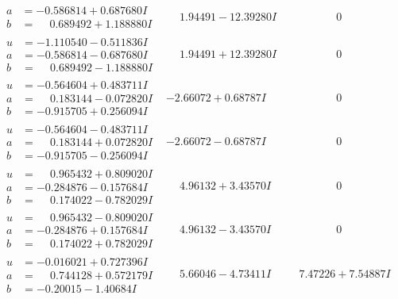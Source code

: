 \documentclass[1p]{elsarticle_modified}
\theoremstyle{definition}
\begin{document}
$$\begin{array}{c|c|c}
\begin{aligned}
a &= -0.586814 + 0.687680 I \\
b &= \phantom{-}0.689492 + 1.188880 I\end{aligned}
 & \phantom{-}1.94491 - 12.39280 I & \phantom{-0.000000 } 0 \\ \hline\begin{aligned}
u &= -1.110540 - 0.511836 I \\
a &= -0.586814 - 0.687680 I \\
b &= \phantom{-}0.689492 - 1.188880 I\end{aligned}
 & \phantom{-}1.94491 + 12.39280 I & \phantom{-0.000000 } 0 \\ \hline\begin{aligned}
u &= -0.564604 + 0.483711 I \\
a &= \phantom{-}0.183144 - 0.072820 I \\
b &= -0.915705 + 0.256094 I\end{aligned}
 & -2.66072 + 0.68787 I & \phantom{-0.000000 } 0 \\ \hline\begin{aligned}
u &= -0.564604 - 0.483711 I \\
a &= \phantom{-}0.183144 + 0.072820 I \\
b &= -0.915705 - 0.256094 I\end{aligned}
 & -2.66072 - 0.68787 I & \phantom{-0.000000 } 0 \\ \hline\begin{aligned}
u &= \phantom{-}0.965432 + 0.809020 I \\
a &= -0.284876 - 0.157684 I \\
b &= \phantom{-}0.174022 - 0.782029 I\end{aligned}
 & \phantom{-}4.96132 + 3.43570 I & \phantom{-0.000000 } 0 \\ \hline\begin{aligned}
u &= \phantom{-}0.965432 - 0.809020 I \\
a &= -0.284876 + 0.157684 I \\
b &= \phantom{-}0.174022 + 0.782029 I\end{aligned}
 & \phantom{-}4.96132 - 3.43570 I & \phantom{-0.000000 } 0 \\ \hline\begin{aligned}
u &= -0.016021 + 0.727396 I \\
a &= \phantom{-}0.744128 + 0.572179 I \\
b &= -0.20015 - 1.40684 I\end{aligned}
 & \phantom{-}5.66046 - 4.73411 I & \phantom{-}7.47226 + 7.54887 I \\ \hline\begin{aligned}

\end{aligned}
\end{array}$$
\end{document}
